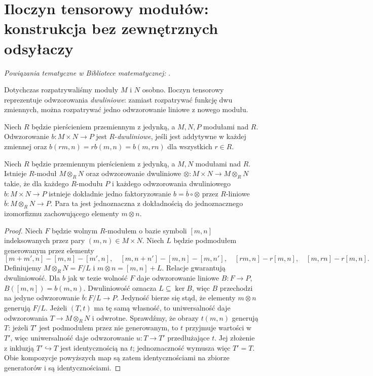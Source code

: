 \section{Iloczyn tensorowy modułów: konstrukcja bez zewnętrznych odsyłaczy}
\label{sec:tensor-algebra-v5}

\noindent\emph{Powiązania tematyczne w Bibliotece matematycznej:} .

Dotychczas rozpatrywaliśmy moduły $M$ i $N$ osobno. Iloczyn
tensorowy reprezentuje odwzorowania \emph{dwuliniowe}:
zamiast rozpatrywać funkcję dwu zmiennych, można rozpatrywać
jedno odwzorowanie liniowe z nowego modułu.

\begin{definicja}
Niech $R$ będzie pierścieniem przemiennym z jedynką,
a $M,N,P$ modułami nad $R$. Odwzorowanie
$b:M\times N\to P$ jest $R$-\emph{dwuliniowe}, jeśli jest
addytywne w każdej zmiennej oraz
$b(rm,n)=r b(m,n)=b(m,rn)$ dla wszystkich $r\in R$.
\end{definicja}
\begin{twierdzenie}
\label{thm:tensor-uni-v5}
Niech $R$ będzie przemiennym pierścieniem z jedynką,
a $M,N$ modułami nad $R$. Istnieje $R$-moduł $M\otimes_RN$
oraz odwzorowanie dwuliniowe
$\otimes:M\times N\to M\otimes_RN$ takie, że
dla każdego $R$-modułu $P$ i każdego odwzorowania
dwuliniowego $b:M\times N\to P$
istnieje dokładnie jedno faktoryzowanie
$b=\overline b\circ\otimes$ przez $R$-liniowe
$\overline b:M\otimes_RN\to P$.
Para ta jest jednoznaczna z dokładnością do jednoznacznego
izomorfizmu zachowującego elementy $m\otimes n$.
\end{twierdzenie}
\begin{proof}
Niech $F$ będzie wolnym $R$-modułem o bazie symboli $[m,n]$
indeksowanych przez pary $(m,n)\in M\times N$.
Niech $L$ będzie podmodułem generowanym przez elementy
\[
[m+m',n]-[m,n]-[m',n],\quad
[m,n+n']-[m,n]-[m,n'],\quad
[rm,n]-r[m,n],\quad[m,rn]-r[m,n].
\]
Definiujemy $M\otimes_RN=F/L$ i $m\otimes n=[m,n]+L$.
Relacje gwarantują dwuliniowość. Dla $b$ jak w tezie
wolność $F$ daje odwzorowanie liniowe $B:F\to P$, $B([m,n])=b(m,n)$.
Dwuliniowość oznacza $L\subseteq\ker B$, więc $B$ przechodzi
na jedyne odwzorowanie $\overline b:F/L\to P$. Jedyność bierze się
stąd, że elementy $m\otimes n$ generują $F/L$.
Jeżeli $(T,t)$ ma tę samą własność, to uniwersalność daje
odwzorowania $T\to M\otimes_RN$ i odwrotne. Sprawdźmy, że obrazy
$t(m,n)$ generują $T$: jeżeli $T'$ jest podmodułem przez nie
generowanym, to $t$ przyjmuje wartości w $T'$, więc
uniwersalność daje odwzorowanie $u:T\to T'$ przedłużające $t$.
Jej złożenie z inkluzją $T'\hookrightarrow T$ jest
identycznością na $t$; jednoznaczność wymusza więc
$T'=T$. Obie kompozycje powyższych map są zatem
identycznościami na zbiorze generatorów i są identycznościami.
\end{proof}
